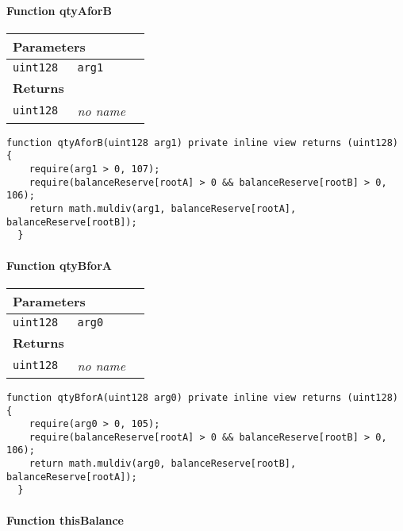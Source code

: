 \paragraph{Function qtyAforB}


\ifsoltables
\noindent\begin{tabular}{|l|l|p{5cm}|}\hline
\multicolumn{3}{|l|}{\bf Parameters}\\\hline
\tt uint128 & \tt arg1 &\\\hline
\multicolumn{3}{|l|}{\bf Returns}\\\hline
\tt uint128 & {\em no name} &\\\hline
\end{tabular}
\fi

\vspace{2cm}

\begin{lstlisting}[firstnumber=184]
  function qtyAforB(uint128 arg1) private inline view returns (uint128) {
    require(arg1 > 0, 107);
    require(balanceReserve[rootA] > 0 && balanceReserve[rootB] > 0, 106);
    return math.muldiv(arg1, balanceReserve[rootA], balanceReserve[rootB]);
  }
\end{lstlisting}

\paragraph{Function qtyBforA}


\ifsoltables
\noindent\begin{tabular}{|l|l|p{5cm}|}\hline
\multicolumn{3}{|l|}{\bf Parameters}\\\hline
\tt uint128 & \tt arg0 &\\\hline
\multicolumn{3}{|l|}{\bf Returns}\\\hline
\tt uint128 & {\em no name} &\\\hline
\end{tabular}
\fi

\vspace{2cm}

\begin{lstlisting}[firstnumber=177]
  function qtyBforA(uint128 arg0) private inline view returns (uint128) {
    require(arg0 > 0, 105);
    require(balanceReserve[rootA] > 0 && balanceReserve[rootB] > 0, 106);
    return math.muldiv(arg0, balanceReserve[rootB], balanceReserve[rootA]);
  }
\end{lstlisting}

\paragraph{Function thisBalance}


